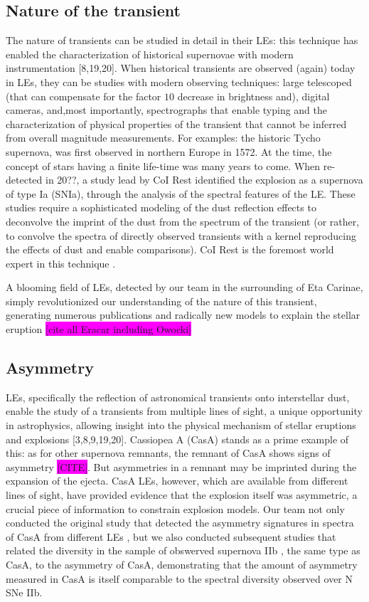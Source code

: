 \documentclass{proposalnsf}
\newcommand{\changeit}[1]{\colorbox{magenta}{#1}}
\begin{document}
\subsection {Nature of the transient}
The nature of transients can be studied in detail in their LEs: this technique has enabled the characterization of historical supernovae with modern instrumentation [8,19,20].  When historical transients are observed (again) today in LEs, they can be studies with modern observing techniques: large telescoped (that can compensate for the factor $10$ decrease in brightness and), digital cameras, and,most importantly, spectrographs that enable typing and the characterization of physical properties of the transient that cannot be inferred from overall magnitude measurements.  For examples: the historic Tycho supernova, was first observed in northern Europe in 1572.  At the time, the concept of stars having a finite life-time was many years to come.  When re-detected in 20??, a study lead by CoI Rest identified the explosion as a supernova of type Ia (SNIa), through the analysis of the spectral features of the LE.  These studies 
require a sophisticated modeling of the dust reflection effects to deconvolve the imprint of the dust from the spectrum of the transient (or rather, to convolve the spectra of directly observed transients with a kernel reproducing the effects of dust and enable comparisons).  CoI Rest is the foremost world expert in this technique \citep{rest11a}.

A blooming field of LEs, detected by our team in the surrounding of Eta Carinae, simply revolutionized our understanding of the nature of this transient, generating numerous publications and radically new models to explain the stellar eruption \changeit{[cite all Eracar including Owocki]}

\subsection{Asymmetry}
LEs, specifically the reflection of astronomical transients onto interstellar dust, enable the study of a transients from multiple lines of sight, a unique opportunity in astrophysics, allowing insight into the physical mechanism of stellar eruptions and explosions [3,8,9,19,20].  Cassiopea A (CasA) stands as a prime example of this: as for other supernova remnants, the remnant of CasA shows signs of asymmetry \changeit{[CITE]}.  But asymmetries in a remnant may be imprinted during the expansion of the ejecta.  CasA LEs, however, which are available from different lines of sight, have provided evidence that the explosion itself was asymmetric, a crucial piece of information to constrain explosion models.  Our team not only conducted the original study that detected the asymmetry signatures in spectra of CasA from different LEs \tochange[RESTCASA], but we also conducted subsequent studies that related the diversity in the sample of obswerved supernova IIb \tochange[Finn], the same type as CasA, to the asymmetry of CasA, demonstrating that the amount of asymmetry measured in CasA is itself comparable to the spectral diversity observed over N SNe IIb.
\end{document}
